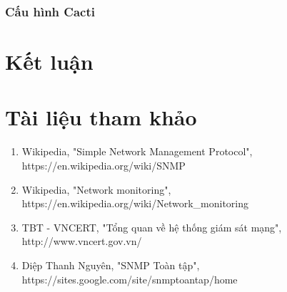 \documentclass[12pt,oneside,a4paper]{article}
\begin{document}
\subsubsection{Cấu hình Cacti}

\section*{Kết luận}
%

\newpage
\section*{Tài liệu tham khảo}
%
%
\begin{enumerate}
\item{Wikipedia, "Simple Network Management Protocol", https://en.wikipedia.org/wiki/SNMP}
\item{Wikipedia, "Network monitoring", https://en.wikipedia.org/wiki/Network\_monitoring}
\item{TBT - VNCERT, "Tổng quan về hệ thống giám sát mạng", http://www.vncert.gov.vn/}
\item{Diệp Thanh Nguyên, "SNMP Toàn tập", https://sites.google.com/site/snmptoantap/home}
\end{enumerate}
	
\end{document}
